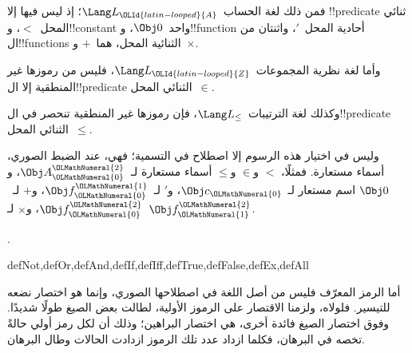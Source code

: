 \documentclass[../../../include/open-logic-section]{subfiles}
\begin{document}
\begin{ex}
فمن ذلك لغة الحساب~$\Lang L_{\OLId{latin-looped}{A}}$؛ إذ ليس فيها إلا !!{predicate}
ثنائي المحل~$<$، و!!{constant} واحد~$\Obj 0$، و!!{function}
أحادية المحل~$\prime$، واثنتان من ال!!{function}s الثنائية المحل، هما~$+$ و~$\times$.
\end{ex}

\begin{ex}
وأما لغة نظرية المجموعات~$\Lang L_{\OLId{latin-looped}{Z}}$، فليس من رموزها غير المنطقية
إلا ال!!{predicate} الثنائي المحل~$\in$.
\end{ex}

\begin{ex}
وكذلك لغة الترتيبات~$\Lang L_\le$، فإن رموزها غير المنطقية تنحصر في
ال!!{predicate} الثنائي المحل~$\le$.
\end{ex}

وليس في اختيار هذه الرسوم إلا اصطلاح في التسمية؛ فهي، عند الضبط
الصوري، أسماء مستعارة. فمثلًا، $<$
و$\in$ و$\le$ أسماء مستعارة لـ~$\Obj A^{\OLMathNumeral{2}}_{\OLMathNumeral{0}}$، و$\Obj 0$ اسم مستعار
لـ~$\Obj c_{\OLMathNumeral{0}}$، و$\prime$ لـ~$\Obj f^{\OLMathNumeral{1}}_{\OLMathNumeral{0}}$، و$+$ لـ~$\Obj f^{\OLMathNumeral{2}}_{\OLMathNumeral{0}}$،
و$\times$ لـ~$\Obj f^{\OLMathNumeral{2}}_{\OLMathNumeral{1}}$.

.

\begin{tagblock}{defNot,defOr,defAnd,defIf,defIff,defTrue,defFalse,defEx,defAll}
\begin{explain}
أما الرمز المعرّف فليس من أصل اللغة في اصطلاحها الصوري، وإنما هو
اختصار نضعه للتيسير. فلولاه، ولزمنا الاقتصار على الرموز الأولية،
لطالت بعض الصيغ طولًا شديدًا. وفوق اختصار الصيغ فائدة أخرى، هي
اختصار البراهين؛ وذلك أن لكل رمز أولي حالةً تخصه في البرهان،
فكلما ازداد عدد تلك الرموز ازدادت الحالات وطال البرهان.
\end{explain}
\end{tagblock}
\end{document}
